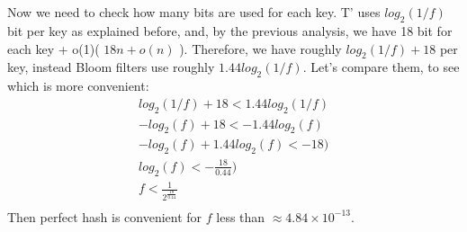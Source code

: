 \documentclass[a4paper]{article}
\begin{document}
\\ 
\\
Now we need to check how many bits are used for each key. T' uses $log_2(1/f)$ bit per key as explained before, and, by the previous analysis, we have 18 bit for each key + o(1)( $18n + o(n)$ ). Therefore, we have roughly $log_2(1/f) + 18$ per key, instead Bloom filters use roughly $1.44 log_2(1/f)$. Let's compare them, to see which is more convenient:
\begin{align*}
log_2(1/f) + 18 < 1.44 log_2(1/f) \\
-log_2(f) + 18 < - 1.44 log_2(f) \\
-log_2(f) + 1.44 log_2(f) < - 18) \\
log_2(f) < -\frac{18}{0.44}) \\
f < \frac{1}{2^{\frac{18}{0.44}}} \\
\end{align*}
Then perfect hash is convenient for $f$ less than $\approx 4.84 \times 10^{-13}$.
\end{document}
